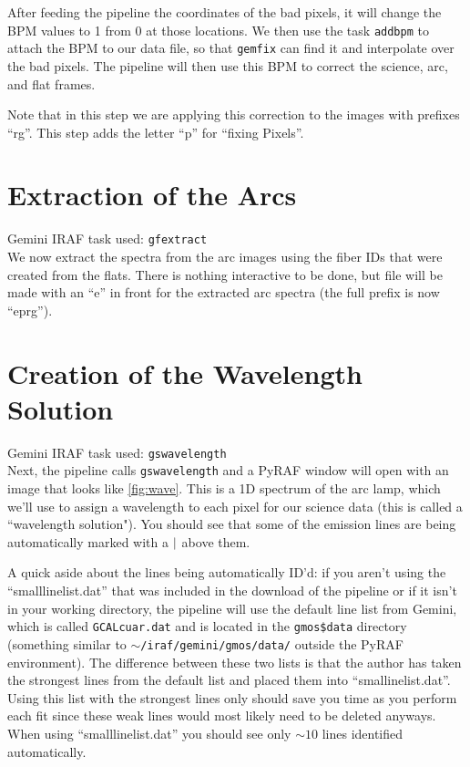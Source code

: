 \documentclass[12pt]{report}
\begin{document}
After feeding the pipeline the coordinates of the bad pixels, it will change the BPM values to 1 from 0 at those locations. We then use the task \texttt{addbpm} to attach the BPM to our data file, so that \texttt{gemfix} can find it and interpolate over the bad pixels. The pipeline will then use this BPM to correct the science, arc, and flat frames. 

Note that in this step we are applying this correction to the images with prefixes ``rg''. This step adds the letter ``p'' for ``fixing Pixels''.

\bigskip
\section{Extraction of the Arcs}
\noindent Gemini IRAF task used: \texttt{gfextract}\\

\noindent We now extract the spectra from the arc images using the fiber IDs that were created from the flats. There is nothing interactive to be done, but file will be made with an ``e'' in front for the extracted arc spectra (the full prefix is now ``eprg'').

\bigskip
\section{Creation of the Wavelength Solution}
\label{waves}

\noindent Gemini IRAF task used: \texttt{gswavelength}\\

\noindent Next, the pipeline calls \texttt{gswavelength} and a PyRAF window will open with an image that looks like \autoref{fig:wave}. This is a 1D spectrum of the arc lamp, which we'll use to assign a wavelength to each pixel for our science data (this is called a ``wavelength solution"). You should see that some of the emission lines are being automatically marked with a $\arrowvert$ above them.

A quick aside about the lines being automatically ID'd: if you aren't using the ``smalllinelist.dat'' that was included in the download of the pipeline or if it isn't in your working directory, the pipeline will use the default line list from Gemini, which is called \texttt{GCALcuar.dat} and is located in the \texttt{gmos\$data} directory (something similar to \texttt{$\sim$/iraf/gemini/gmos/data/} outside the PyRAF environment). The difference between these two lists is that the author has taken the strongest lines from the default list and placed them into ``smallinelist.dat''. Using this list with the strongest lines only should save you time as you perform each fit since these weak lines would most likely need to be deleted anyways. When using ``smalllinelist.dat'' you should see only $\sim 10$ lines identified automatically.
\end{document}
